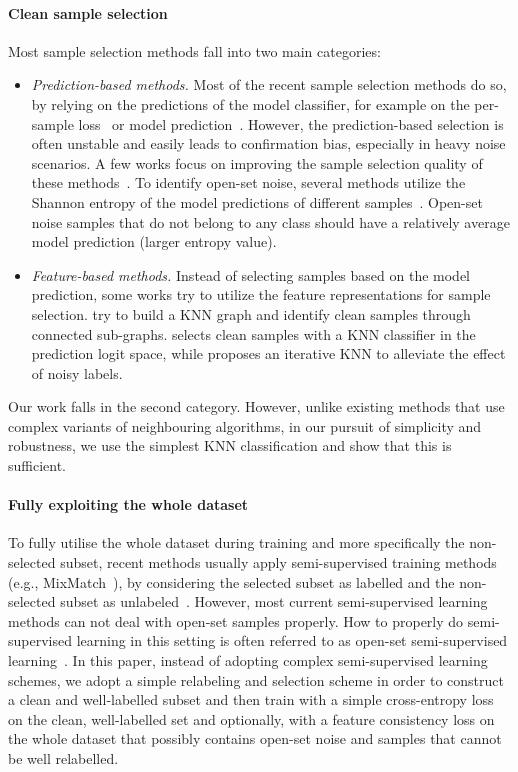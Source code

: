 \documentclass{bmvc2k}
\begin{document}
\paragraph{Clean sample selection} Most sample selection methods fall into two main categories: 
\begin{itemize}[itemsep=0em]
\item \textit{Prediction-based methods.} Most of the recent sample selection methods do so, by relying on the predictions of the model classifier, for example on the per-sample loss~\citep{lossmodellingbmm, dividemix} or model prediction~\citep{selfie, whentohow}. However, the prediction-based selection is often unstable and easily leads to confirmation bias, especially in heavy noise scenarios. A few works focus on improving the sample selection quality of these methods~\citep{xia2021sample, zhou2020robust}. To identify open-set noise, several methods utilize the Shannon entropy of the model predictions of different samples~\citep{evidentialmix, albert2022addressing}. Open-set noise samples that do not belong to any class should have a relatively average model prediction (larger entropy value).

\item \textit{Feature-based methods.} Instead of selecting samples based on the model prediction, some works try to utilize the feature representations for sample selection. \citet{topofilter,ngc} try to build a KNN graph and identify clean samples through connected sub-graphs. \citet{deep-knn} selects clean samples with a KNN classifier in the prediction logit space, while \citet{moit} proposes an iterative KNN to alleviate the effect of noisy labels.
\end{itemize}



Our work falls in the second category. However, unlike existing methods that use complex variants of neighbouring algorithms, in our pursuit of simplicity and robustness, we use the simplest KNN classification and show that this is sufficient. 

\paragraph{Fully exploiting the whole dataset} To fully utilise the whole dataset during training and more specifically the non-selected subset, recent methods usually apply semi-supervised training methods (e.g., MixMatch~\citep{mixmatch}), by considering the selected subset as labelled and the non-selected subset as unlabeled~\citep{dividemix}. However, most current semi-supervised learning methods can not deal with open-set samples properly. How to properly do semi-supervised learning in this setting is often referred to as open-set semi-supervised learning~\citep{MTC, openmatch}. In this paper, instead of adopting complex semi-supervised learning schemes, we adopt a simple relabeling and selection scheme in order to construct a clean and well-labelled subset and then train with a simple cross-entropy loss on the clean, well-labelled set and optionally, with a feature consistency loss on the whole dataset that possibly contains open-set noise and samples that cannot be well relabelled.
\end{document}
